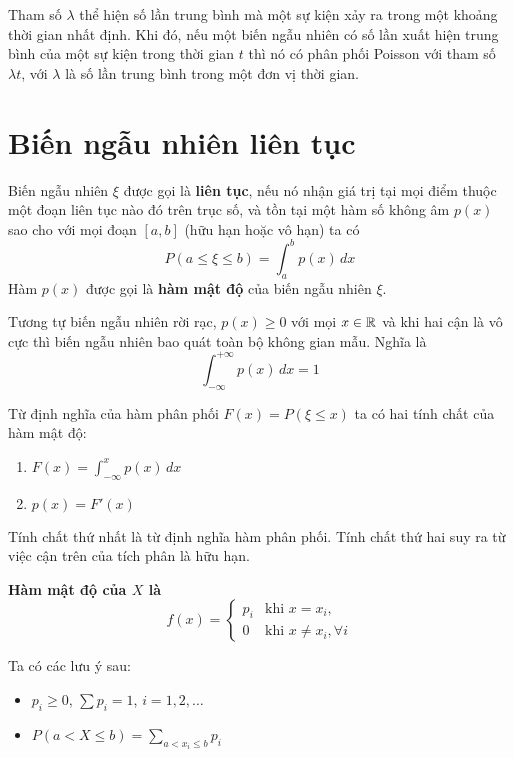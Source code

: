 Tham số $\lambda$ thể hiện số lần trung bình mà một sự kiện xảy ra trong một khoảng thời gian nhất định. Khi đó, nếu một biến ngẫu nhiên có số lần xuất hiện trung bình của một sự kiện trong thời gian $t$ thì nó có phân phối Poisson với tham số $\lambda t$, với $\lambda$ là số lần trung bình trong một đơn vị thời gian.

\section{Biến ngẫu nhiên liên tục}

\begin{definition}
    Biến ngẫu nhiên $\xi$ được gọi là \textbf{liên tục}, nếu nó nhận giá trị tại mọi điểm thuộc một đoạn liên tục nào đó trên trục số, và tồn tại một hàm số không âm $p(x)$ sao cho với mọi đoạn $[a ,b]$ (hữu hạn hoặc vô hạn) ta có
    \begin{equation}
        P(a \leq \xi \leq b) = \int_{a}^{b} p(x)\, dx
    \end{equation}
    Hàm $p(x)$ được gọi là \textbf{hàm mật độ} của biến ngẫu nhiên $\xi$.
\end{definition}

Tương tự biến ngẫu nhiên rời rạc, $p(x) \geq 0$ với mọi $x \in \mathbb{R}$ và khi hai cận là vô cực thì biến ngẫu nhiên bao quát toàn bộ không gian mẫu. Nghĩa là \[ \int_{-\infty}^{+\infty} p(x)\, dx = 1 \]

Từ định nghĩa của hàm phân phối $F(x) = P(\xi \leq x)$ ta có hai tính chất của hàm mật độ:

\begin{enumerate}
    \item $\displaystyle{F(x) = \int_{-\infty}^{x} p(x)\, dx}$
    \item $p(x) = F'(x)$
\end{enumerate}

Tính chất thứ nhất là từ định nghĩa hàm phân phối. Tính chất thứ hai suy ra từ việc cận trên của tích phân là hữu hạn.

\textbf{Hàm mật độ của $X$ là} \[f(x) = \begin{cases}
        p_i & \text{khi } x = x_i, \\
        0 & \text{khi } x \neq x_i, \forall i
\end{cases}\]

\begin{remark}
    Ta có các lưu ý sau:
    \begin{itemize}
        \item $p_i \geq 0$, $\sum p_i = 1$, $i = 1, 2, \ldots$
    
        \item $\displaystyle{P(a < X \leq b) = \sum_{a < x_i \leq b} p_i}$
    \end{itemize}
\end{remark}

